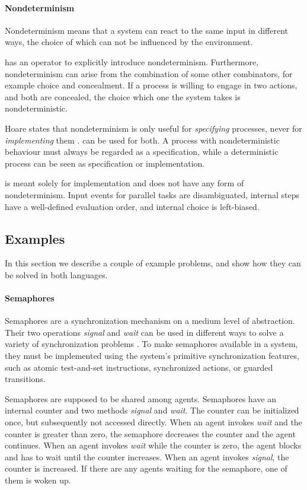 \paragraph{Nondeterminism}

Nondeterminism means that a system can react to the same input in different ways, the choice of which can not be influenced by the environment.

\CSP has an operator to explicitly introduce nondeterminism.
Furthermore, nondeterminism can arise from the combination of some other combinators, for example choice and concealment.
If a process is willing to engage in two actions, and both are concealed, the choice which one the system takes is nondeterministic.

Hoare states that nondeterminism is only useful for \emph{specifying} processes, never for \emph{implementing} them \cite{books/Hoare85CSP}.
\CSP can be used for both.
A process with nondeterministic behaviour must always be regarded as a specification, while a deterministic process can be seen as specification or implementation.

\TOP is meant solely for implementation and does not have any form of nondeterminism.
Input events for parallel tasks are disambiguated, internal steps have a well-defined evaluation order, and internal choice is left-biased.


\subsection{Examples}

In this section we describe a couple of example problems, and show how they can be solved in both languages.




\paragraph{Semaphores}

Semaphores are a synchronization mechanism on a medium level of abstraction.
Their two operations \emph{signal} and \emph{wait} can be used in different ways to solve a variety of synchronization problems \cite{books/Downey08LBOS}.
To make semaphores available in a system, they must be implemented using the system's primitive synchronization features, such as atomic test-and-set instructions, synchronized actions, or guarded transitions.

Semaphores are supposed to be shared among agents.
Semaphores have an internal counter and two methods \emph{signal} and \emph{wait}.
The counter can be initialized once, but subsequently not accessed directly.
When an agent invokes \emph{wait} and the counter is greater than zero, the semaphore decreases the counter and the agent continues.
When an agent invokes \emph{wait} while the counter is zero, the agent blocks and has to wait until the counter increases.
When an agent invokes \emph{signal}, the counter is increased.
If there are any agents waiting for the semaphore, one of them is woken up.

